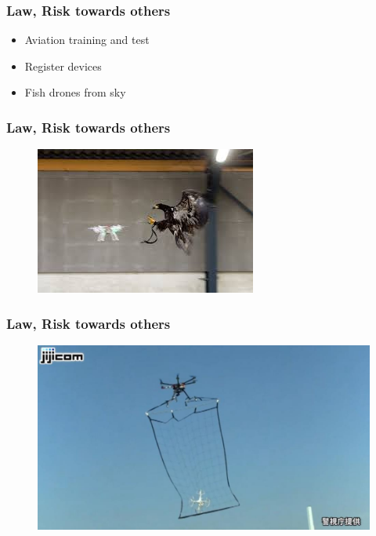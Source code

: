\begin{frame}
\frametitle{Law, Risk towards others}

  \begin{itemize}
  	\item Aviation training and test
    \item Register devices    
	\item Fish drones from sky
  \end{itemize}
  	
\end{frame}



\begin{frame}
\frametitle{Law, Risk towards others}
  
  \begin{figure}
  \includegraphics[scale=0.9]{pic/03_our-copter/eagle.jpeg}
  \end{figure}

\end{frame}



\begin{frame}
\frametitle{Law, Risk towards others}
  
  \begin{figure}
  \includegraphics[scale=0.31]{pic/03_our-copter/net.jpg}
  \end{figure}

\end{frame}



